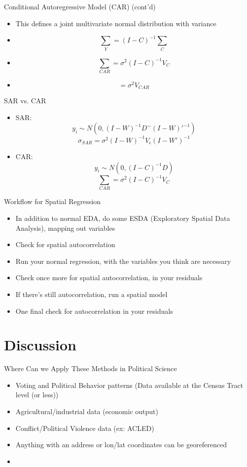 \documentclass[aspectratio = 169, 12pt]{beamer}\usepackage[]{graphicx}\usepackage[]{color}
\begin{document}
\begin{frame}{Conditional Autoregressive Model (CAR) (cont'd)}
\begin{itemize}
\item This defines a joint multivariate normal distribution with variance
\item $$ \sum_Y = (I - C)^{-1} \sum_{C} $$
\item $$ \sum_{CAR} = \sigma^{2} (I - C)^{-1} V_{C} $$
\item $$ = \sigma^{2}V_{CAR} $$
\end{itemize}
\end{frame}


\begin{frame}{SAR vs. CAR}
\begin{itemize}
\item SAR: $$ y_i \sim N(0, (I-W)^{-1} D^{\sim} (I-W)'^{-1}) $$
 $$ \sigma_{SAR} = \sigma^{2} (I - W)^{-1} V_{\epsilon} (I - W')^{-1} $$
\item CAR: $$ y_i \sim N(0, (I-C)^{-1} D )$$
 $$ \sum_{CAR} = \sigma^{2} (I - C)^{-1} V_{C} $$
\end{itemize}
\end{frame}



\begin{frame}{Workflow for Spatial Regression}
\begin{itemize}
\item In addition to normal EDA, do some ESDA (Exploratory Spatial Data Analysis), mapping out variables
\item Check for spatial autocorrelation
\item Run your normal regression, with the variables you think are necessary
\item Check once more for spatial autocorrelation, in your residuals
\item If there's still autocorrelation, run a spatial model
\item One final check for autocorrelation in your residuals
\end{itemize}
\end{frame}

\section{Discussion}
\begin{frame}{Where Can we Apply These Methods in Political Science}
\begin{itemize}
\item Voting and Political Behavior patterns (Data available at the Census Tract level (or less))
\item Agricultural/industrial data (economic output)
\item Conflict/Political Violence data (ex: ACLED)
\item Anything with an address or lon/lat coordinates can be georeferenced
\item
\end{itemize}
\end{frame}
\end{document}
